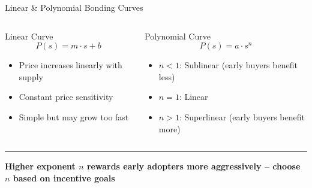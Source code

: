 \documentclass[8pt,aspectratio=169]{beamer}
\newcommand{\bottomnote}[1]{\vfill\vspace{-2mm}\textcolor{mllavender2}{\rule{\textwidth}{0.4pt}}\vspace{1mm}\footnotesize\textbf{#1}}
\begin{document}
\begin{frame}{Linear \& Polynomial Bonding Curves}
\begin{columns}[T]
\begin{block}{Linear Curve}
\footnotesize
\[
P(s) = m \cdot s + b
\]
\begin{itemize}
  \item Price increases linearly with supply
  \item Constant price sensitivity
  \item Simple but may grow too fast
\end{itemize}
\end{block}
\vspace{1mm}
\begin{block}{Polynomial Curve}
\footnotesize
\[
P(s) = a \cdot s^n
\]
\begin{itemize}
  \item $n < 1$: Sublinear (early buyers benefit less)
  \item $n = 1$: Linear
  \item $n > 1$: Superlinear (early buyers benefit more)
\end{itemize}
\end{block}

\end{columns}
\bottomnote{Higher exponent $n$ rewards early adopters more aggressively -- choose $n$ based on incentive goals}
\end{frame}
\end{document}
